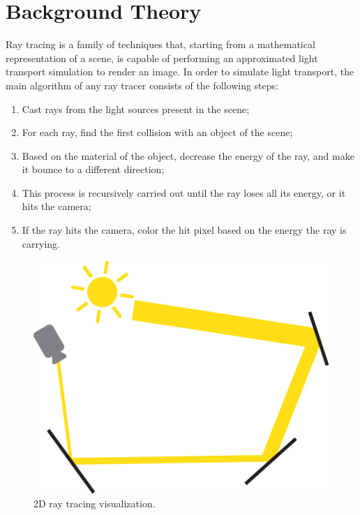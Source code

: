 \documentclass[11pt,a4paper,twocolumn]{article}
\begin{document}
\section{Background Theory}
Ray tracing is a family of techniques that, starting from a mathematical representation of a scene, is capable of performing an approximated light transport simulation to render an image. In order to simulate light transport, the main algorithm of any ray tracer consists of the following steps:
\begin{enumerate}
    \item Cast rays from the light sources present in the scene;
    \item For each ray, find the first collision with an object of the scene;
    \item Based on the material of the object, decrease the energy of the ray, and make it bounce to a different direction;
    \item This process is recursively carried out until the ray loses all its energy, or it hits the camera;
    \item If the ray hits the camera, color the hit pixel based on the energy the ray is carrying.
\end{enumerate}

\begin{figure}[H]
    \centering
    \includegraphics[width=\textwidth*\real{0.22}]{Images/ray_tracing_simple.png}
    \caption{2D ray tracing visualization.}
    \label{fig:ray_tracing_simple}
\end{figure}
\end{document}
